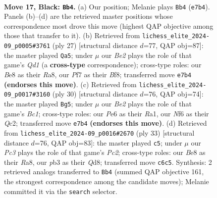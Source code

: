 \documentclass[11pt]{article}
\begin{document}
\clearpage

\begin{figure}[p]\centering
\begin{subfigure}{0.46\textwidth}\centering
\resizebox{\linewidth}{!}{%
\newchessgame
\chessboard[
  setfen={2r1b1k1/p1qrbpp1/npp1pn2/7p/P1NP1P2/1PN3P1/4P2P/R1BQRBK1 b - - 5 17},
  showmover=false,
  pgfstyle=straightmove, color=movearrow, markmove={e7-b4}
]}
\caption{}
\end{subfigure}\hfill
\begin{subfigure}{0.46\textwidth}\centering
\resizebox{\linewidth}{!}{%
\newchessgame
\chessboard[
  setfen={r2qrbk1/pp1b1ppp/2pp1nn1/8/P2NPP2/2N4P/1PP3P1/R1BQRBK1 b - - 4 14},
  showmover=false,
  pgfstyle=straightmove, color=movearrow, markmove={d8-a5}
]}
\caption{}
\end{subfigure}
\\[4pt]
\begin{subfigure}{0.46\textwidth}\centering
\resizebox{\linewidth}{!}{%
\newchessgame
\chessboard[
  setfen={r1br2k1/2q2pbp/p1npp1p1/1pn5/4P3/N1P2N2/PPQ1BPPP/R1BR2K1 w - - 0 16},
  showmover=false,
  pgfstyle=straightmove, color=movearrow, markmove={c1-g5}
]}
\caption{}
\end{subfigure}\hfill
\begin{subfigure}{0.46\textwidth}\centering
\resizebox{\linewidth}{!}{%
\newchessgame
\chessboard[
  setfen={r2qrbk1/1bp2p2/p2p1npp/1p6/2nNP3/2P2PN1/PPB3PP/R1BQR1K1 b - - 2 17},
  showmover=false,
  pgfstyle=straightmove, color=movearrow, markmove={c7-c5}
]}
\caption{}
\end{subfigure}
\caption{\textbf{Move 17, Black: \texttt{Bb4}.} (a) Our position; Melanie plays \texttt{Bb4} (\texttt{e7b4}). Panels (b)--(d) are the retrieved master positions whose correspondence most drove this move (highest QAP objective among those that transfer to it). (b) Retrieved from \texttt{lichess\_elite\_2024-09\_p0005\#3761} (ply 27) [structural distance $d$=77, QAP obj=87]: the master played \texttt{Qa5}; under $\mu$ our \emph{Be2} plays the role of that game's \emph{Qd1} (a \textbf{cross-type} correspondence); cross-type roles: our \emph{B}e8 as their \emph{R}a8, our \emph{P}f7 as their \emph{B}f8; transferred move \texttt{e7b4} \textbf{(endorses this move)}. (c) Retrieved from \texttt{lichess\_elite\_2024-09\_p0017\#3160} (ply 30) [structural distance $d$=76, QAP obj=74]: the master played \texttt{Bg5}; under $\mu$ our \emph{Be2} plays the role of that game's \emph{Bc1}; cross-type roles: our \emph{P}e6 as their \emph{R}a1, our \emph{N}f6 as their \emph{Q}c2; transferred move \texttt{e7b4} \textbf{(endorses this move)}. (d) Retrieved from \texttt{lichess\_elite\_2024-09\_p0016\#2670} (ply 33) [structural distance $d$=76, QAP obj=83]: the master played \texttt{c5}; under $\mu$ our \emph{Pc3} plays the role of that game's \emph{Pc2}; cross-type roles: our \emph{B}e8 as their \emph{R}a8, our \emph{p}b3 as their \emph{Q}d8; transferred move \texttt{c6c5}. Synthesis: 2 retrieved analogs transferred to \texttt{Bb4} (summed QAP objective 161, the strongest correspondence among the candidate moves); Melanie committed it via the \texttt{search} selector.}
\label{fig:thought-m33}
\end{figure}
\end{document}
